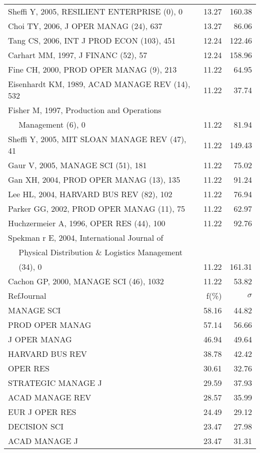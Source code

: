 \documentclass[a4paper,11pt]{report}
\begin{document}
\begin{landscape}
\begin{table}[!ht]
{\begin{tabular}{|l r r|}
Sheffi Y, 2005, RESILIENT ENTERPRISE (0), 0 & 13.27 & 160.38\\
Choi TY, 2006, J OPER MANAG (24), 637 & 13.27 & 86.06\\
Tang CS, 2006, INT J PROD ECON (103), 451 & 12.24 & 122.46\\
Carhart MM, 1997, J FINANC (52), 57 & 12.24 & 158.96\\
Fine CH, 2000, PROD OPER MANAG (9), 213 & 11.22 & 64.95\\
Eisenhardt KM, 1989, ACAD MANAGE REV (14), 532 & 11.22 & 37.74\\
Fisher M, 1997, Production and Operations &  & \\
$\quad$ Management (6), 0 & 11.22 & 81.94\\
Sheffi Y, 2005, MIT SLOAN MANAGE REV (47), 41 & 11.22 & 149.43\\
Gaur V, 2005, MANAGE SCI (51), 181 & 11.22 & 75.02\\
Gan XH, 2004, PROD OPER MANAG (13), 135 & 11.22 & 91.24\\
Lee HL, 2004, HARVARD BUS REV (82), 102 & 11.22 & 76.94\\
Parker GG, 2002, PROD OPER MANAG (11), 75 & 11.22 & 62.97\\
Huchzermeier A, 1996, OPER RES (44), 100 & 11.22 & 92.76\\
Spekman r E, 2004, International Journal of &  & \\
$\quad$ Physical Distribution \& Logistics Management &  & \\
$\quad$ (34), 0 & 11.22 & 161.31\\
Cachon GP, 2000, MANAGE SCI (46), 1032 & 11.22 & 53.82\\
\hline
\hline
RefJournal & f(\%) & $\sigma$\\
\hline
MANAGE SCI & 58.16 & 44.82\\
PROD OPER MANAG & 57.14 & 56.66\\
J OPER MANAG & 46.94 & 49.64\\
HARVARD BUS REV & 38.78 & 42.42\\
OPER RES & 30.61 & 32.76\\
STRATEGIC MANAGE J & 29.59 & 37.93\\
ACAD MANAGE REV & 28.57 & 35.99\\
EUR J OPER RES & 24.49 & 29.12\\
DECISION SCI & 23.47 & 27.98\\
ACAD MANAGE J & 23.47 & 31.31\\
\hline
\end{tabular}
}
\end{table}


\end{landscape}
\end{document}
